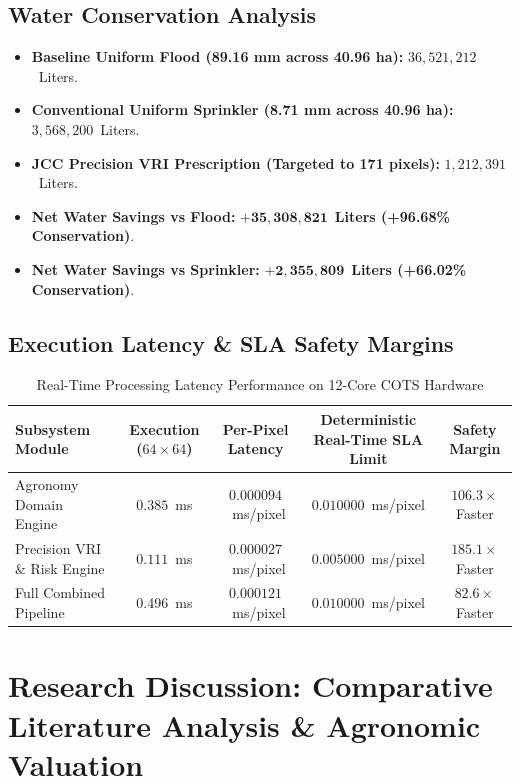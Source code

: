 \documentclass[11pt,a4paper]{article}
\theoremstyle{definition}
\theoremstyle{remark}
\begin{document}
\subsection{Water Conservation Analysis}
\begin{itemize}
    \item \textbf{Baseline Uniform Flood (89.16 mm across 40.96 ha):} $36,521,212$~Liters.
    \item \textbf{Conventional Uniform Sprinkler (8.71 mm across 40.96 ha):} $3,568,200$~Liters.
    \item \textbf{JCC Precision VRI Prescription (Targeted to 171 pixels):} $1,212,391$~Liters.
    \item \textbf{Net Water Savings vs Flood:} $\mathbf{+35,308,821}$~\textbf{Liters (+96.68\% Conservation)}.
    \item \textbf{Net Water Savings vs Sprinkler:} $\mathbf{+2,355,809}$~\textbf{Liters (+66.02\% Conservation)}.
\end{itemize}

\subsection{Execution Latency \& SLA Safety Margins}
\begin{table}[htbp]
\centering
\caption{Real-Time Processing Latency Performance on 12-Core COTS Hardware}
\label{tab:latency_sla}
\small
\begin{tabular}{lcccc}
\toprule
\textbf{Subsystem Module} & \textbf{Execution ($64 \times 64$)} & \textbf{Per-Pixel Latency} & \textbf{Deterministic Real-Time SLA Limit} & \textbf{Safety Margin} \\
\midrule
Agronomy Domain Engine       & $0.385$~ms & $0.000094$~ms/pixel & $0.010000$~ms/pixel & $\mathbf{106.3\times}$ Faster \\
Precision VRI \& Risk Engine & $0.111$~ms & $0.000027$~ms/pixel & $0.005000$~ms/pixel & $\mathbf{185.1\times}$ Faster \\
Full Combined Pipeline       & $0.496$~ms & $0.000121$~ms/pixel & $0.010000$~ms/pixel & $\mathbf{82.6\times}$ Faster \\
\bottomrule
\end{tabular}
\end{table}


\section{Research Discussion: Comparative Literature Analysis \& Agronomic Valuation}
\end{document}
